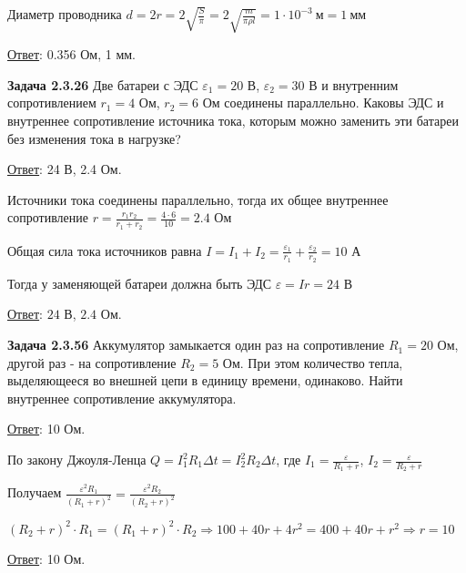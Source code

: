 Диаметр проводника $d = 2r = 2\sqrt{\frac{S}{\pi}} = 2\sqrt{\frac{m}{\pi \rho l}} = 1 \cdot 10^{-3} \ \text{м} = 1 \ \text{мм}$

\bigvspace

\underline{Ответ}: 0.356 Ом, 1 мм.

\begin{tcolorbox}
    \textbf{Задача 2.3.26} Две батареи с ЭДС $\varepsilon_1 = 20$ В, $\varepsilon_2 = 30$ В и внутренним
    сопротивлением $r_1 = 4$ Ом, $r_2 = 6$ Ом соединены параллельно. Каковы
    ЭДС и внутреннее сопротивление источника тока, которым можно заменить 
    эти батареи без изменения тока в нагрузке?

    \begin{UpsideDown}
        \footnotesize
        \underline{Ответ}: 24 В, 2.4 Ом.
    \end{UpsideDown}
\end{tcolorbox}

Источники тока соединены параллельно, тогда их общее внутреннее сопротивление $r = \frac{r_1 r_2}{r_1 + r_2} = \frac{4 \cdot 6}{10}= 2.4$ Ом

Общая сила тока источников равна $I = I_1 + I_2 = \frac{\varepsilon_1}{r_1} + \frac{\varepsilon_2}{r_2} = 10$ А

Тогда у заменяющей батареи должна быть ЭДС $\varepsilon = Ir = 24$ В

\bigvspace

\underline{Ответ}: $24$ В, $2.4$ Ом.


\begin{tcolorbox}
    \textbf{Задача 2.3.56} Аккумулятор замыкается один раз на сопротивление $R_1 = 20$ Ом, 
    другой раз - на сопротивление $R_2 = 5$ Ом. При этом количество
    тепла, выделяющееся во внешней цепи в единицу времени, одинаково.
    Найти внутреннее сопротивление аккумулятора.
    
    \begin{UpsideDown}
        \footnotesize
        \underline{Ответ}: 10 Ом.
    \end{UpsideDown}
\end{tcolorbox}

По закону Джоуля-Ленца $Q = I_1^2 R_1 \Delta t = I_2^2 R_2 \Delta t$, где $I_1 = \frac{\varepsilon}{R_1 + r}$, $I_2 = \frac{\varepsilon}{R_2 + r}$

Получаем $\frac{\varepsilon^2 R_1}{(R_1 + r)^2} = \frac{\varepsilon^2 R_2}{(R_2 + r)^2}$

$(R_2 + r)^2 \cdot R_1 = (R_1 + r)^2 \cdot R_2 \Longrightarrow 100 + 40r + 4r^2 = 400 + 40r + r^2 \Longrightarrow r = 10$

\bigvspace

\underline{Ответ}: 10 Ом.
